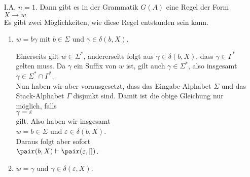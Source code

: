 \begin{enumerate}
\item[I.A.] $n = 1$.  Dann gibt es in der Grammatik $G(A)$ eine Regel der Form 
            \\[0.2cm]
            \hspace*{1.3cm}
            $X \rightarrow w$
            \\[0.2cm]
            Es gibt zwei M\"oglichkeiten, wie diese Regel entstanden sein kann.
            \begin{enumerate}
            \item $w = b \gamma$ mit $b \in \Sigma$ und $\gamma \in \delta(b,X)$.

                  Einerseits gilt $w \in \Sigma^*$, andererseits folgt aus $\gamma \in \delta(b,X)$,
                  dass $\gamma \in \Gamma^*$ gelten muss.  Da $\gamma$ ein Suffix von $w$ ist, gilt
                  auch $\gamma \in \Sigma^*$, also insgesamt
                  \\[0.2cm]
                  \hspace*{1.3cm}
                  $\gamma \in \Sigma^* \cap \Gamma^*$.
                  \\[0.2cm]
                  Nun haben wir aber vorausgesetzt, dass das Eingabe-Alphabet $\Sigma$ und das
                  Stack-Alphabet $\Gamma$ disjunkt sind.  Damit ist die obige Gleichung nur m\"oglich,
                  falls
                  \\[0.2cm]
                  \hspace*{1.3cm}
                  $\gamma = \varepsilon$
                  \\[0.2cm]
                  gilt.  Also haben wir insgesamt
                  \\[0.2cm]
                  \hspace*{1.3cm}
                  $w = b \in \Sigma$ \quad und \quad $\varepsilon \in \delta(b,X)$.
                  \\[0.2cm]
                  Daraus folgt aber sofort
                  \\[0.2cm]
                  \hspace*{1.3cm}
                  $\pair(b, X) \vdash \pair(\varepsilon, [])$.
            \item $w = \gamma$ und $\gamma \in \delta(\varepsilon, X)$.


\end{enumerate}
\end{enumerate}
